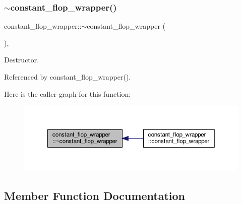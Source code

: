 \subsubsection{\texorpdfstring{$\sim$constant\+\_\+flop\+\_\+wrapper()}{~constant\_flop\_wrapper()}}
{\footnotesize\ttfamily constant\+\_\+flop\+\_\+wrapper\+::$\sim$constant\+\_\+flop\+\_\+wrapper (\begin{DoxyParamCaption}{ }\end{DoxyParamCaption})\hspace{0.3cm}{\ttfamily [override]}, {\ttfamily [default]}}



Destructor. 



Referenced by constant\+\_\+flop\+\_\+wrapper().

Here is the caller graph for this function\+:
\nopagebreak
\begin{figure}[H]
\begin{center}
\leavevmode
\includegraphics[width=350pt]{d4/da9/classconstant__flop__wrapper_aa84440ae06557264567580d2d0a4882e_icgraph}
\end{center}
\end{figure}


\subsection{Member Function Documentation}
\mbox{\label{classconstant__flop__wrapper_ac777a3cbc3fa01f98f7e2df0465a3451}} 

